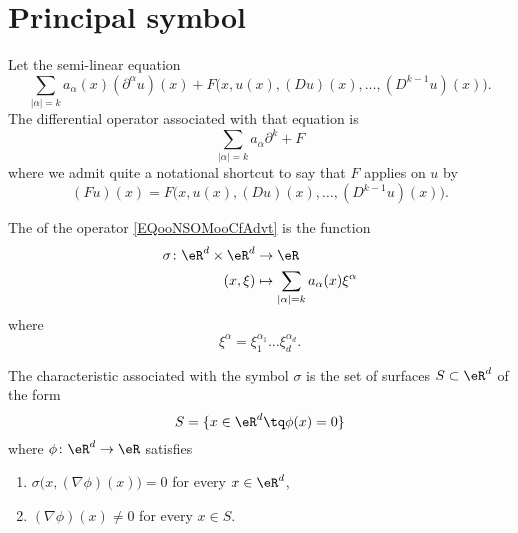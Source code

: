 \section{Principal symbol}

Let the semi-linear equation
\begin{equation}
	\sum_{| \alpha |=k}a_{\alpha}(x)(\partial^{\alpha}u)(x)+F\big( x,u(x),(Du)(x),\ldots,(D^{k-1}u)(x) \big).
\end{equation}
The differential operator associated with that equation is
\begin{equation}       \label{EQooNSOMooCfAdvt}
	\sum_{| \alpha |=k}a_{\alpha}\partial^k +F
\end{equation}
where we admit quite a notational shortcut to say that \( F\) applies on \( u\) by
\begin{equation}
	(Fu)(x)=F  \big( x,u(x),(Du)(x),\ldots,(D^{k-1}u)(x) \big).
\end{equation}

\begin{definition}
	The  of the operator \eqref{EQooNSOMooCfAdvt} is the function
	\begin{equation}
		\begin{aligned}
			\sigma\colon \eR^d\times \eR^d & \to \eR                                              \\
			(x,\xi)                        & \mapsto \sum_{| \alpha |=k}a_{\alpha}(x)\xi^{\alpha}
		\end{aligned}
	\end{equation}
	where
	\begin{equation}
		\xi^{\alpha}=\xi_1^{\alpha_1}\ldots \xi_d^{\alpha_d}.
	\end{equation}
\end{definition}

\begin{definition}
	The characteristic associated with the symbol \( \sigma\) is the set of surfaces \( S\subset \eR^d\) of the form
	\begin{equation}
		S=\{ x\in \eR^d\tq \phi(x)=0 \}
	\end{equation}
	where \( \phi\colon \eR^d\to \eR\) satisfies
	\begin{enumerate}
		\item
		      \( \sigma\big( x,(\nabla \phi)(x) \big)=0\) for every \( x\in\eR^d\),
		\item
		      \( (\nabla\phi)(x)\neq 0\) for every \( x\in S\).
	\end{enumerate}
\end{definition}

